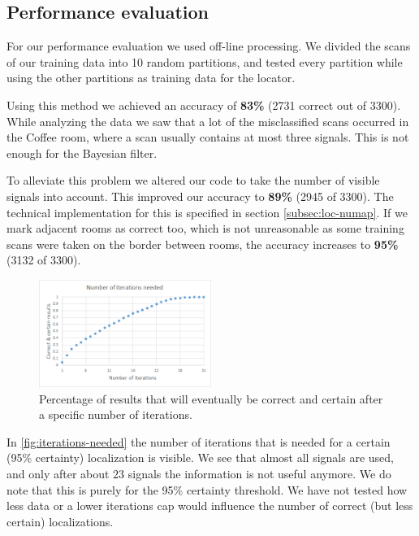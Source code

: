 \documentclass[a4paper,10pt,twoside]{IEEEtran}
\begin{document}
\subsection{Performance evaluation}
\label{sec:loc-evaluation}

For our performance evaluation we used off-line processing. We divided the scans of our training data into 10 random partitions, and tested every partition while using the other partitions as training data for the locator.

Using this method we achieved an accuracy of \textbf{83\%} (2731 correct out of 3300).
While analyzing the data we saw that a lot of the misclassified scans occurred in the Coffee room,
where a scan usually contains at most three signals. This is not enough for the Bayesian filter.

To alleviate this problem we altered our code to take the number of visible signals into account.
This improved our accuracy to \textbf{89\%} (2945 of 3300).
The technical implementation for this is specified in section \ref{subsec:loc-numap}.
If we mark adjacent rooms as correct too, which is not unreasonable as some training scans were taken on the border between rooms, the accuracy increases to \textbf{95\%} (3132 of 3300).

\begin{figure}
  \centering
    \includegraphics[width=0.5\textwidth]{iterations_needed}
    \caption{Percentage of results that will eventually be correct and certain after a specific number of iterations.}
    \label{fig:iterations-needed}
\end{figure}

In \autoref{fig:iterations-needed} the number of iterations that is needed for a certain (95\% certainty) localization is visible.
We see that almost all signals are used, and only after about 23 signals the information is not useful anymore.
We do note that this is purely for the 95\% certainty threshold.
We have not tested how less data or a lower iterations cap would influence the number of correct (but less certain) localizations.
\end{document}
